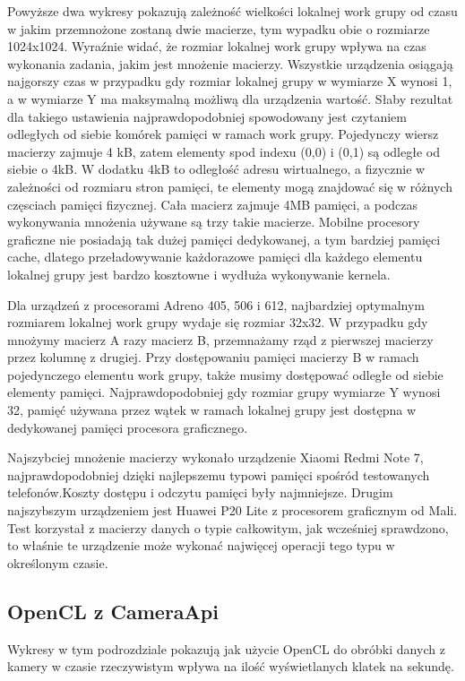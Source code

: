 Powyższe dwa wykresy pokazują zależność wielkości lokalnej work grupy od czasu w jakim przemnożone zostaną dwie macierze, tym wypadku obie o rozmiarze 1024x1024. Wyraźnie widać, że rozmiar lokalnej work grupy wpływa na czas wykonania zadania, jakim jest mnożenie macierzy. Wszystkie urządzenia osiągają najgorszy czas w przypadku gdy rozmiar lokalnej grupy w wymiarze X wynosi 1, a w wymiarze Y ma maksymalną możliwą dla urządzenia wartość. Słaby rezultat dla takiego ustawienia najprawdopodobniej spowodowany jest czytaniem odległych od siebie komórek pamięci w ramach work grupy. Pojedynczy wiersz macierzy zajmuje 4 kB, zatem elementy spod indexu (0,0) i (0,1) są odległe od siebie o 4kB. W dodatku 4kB to odległość adresu wirtualnego, a fizycznie w zależności od rozmiaru stron pamięci, te elementy mogą znajdować się w różnych częsciach pamięci fizycznej. Cała macierz zajmuje 4MB pamięci, a podczas wykonywania mnożenia używane są trzy takie macierze. Mobilne procesory graficzne nie posiadają tak dużej  pamięci dedykowanej, a tym bardziej pamięci cache, dlatego przeładowywanie każdorazowe pamięci dla każdego elementu lokalnej grupy jest bardzo kosztowne i wydłuża wykonywanie kernela. 

Dla urządzeń z procesorami Adreno 405, 506 i 612, najbardziej optymalnym rozmiarem lokalnej work grupy wydaje się rozmiar 32x32. W przypadku gdy mnożymy macierz A razy macierz B, przemnażamy rząd z pierwszej macierzy przez kolumnę z drugiej. Przy dostępowaniu pamięci macierzy B w ramach pojedynczego elementu work grupy, także musimy dostępować odległe od siebie elementy pamięci. Najprawdopodobniej gdy rozmiar grupy  wymiarze Y wynosi 32, pamięć używana przez wątek w ramach lokalnej grupy jest dostępna w dedykowanej pamięci procesora graficznego. 

Najszybciej mnożenie macierzy wykonało urządzenie Xiaomi Redmi Note 7, najprawdopodobniej dzięki najlepszemu typowi pamięci spośród testowanych telefonów.Koszty dostępu i odczytu pamięci były najmniejsze. Drugim najszybszym urządzeniem jest Huawei P20 Lite z procesorem graficznym od Mali. Test korzystał z macierzy danych o typie całkowitym, jak wcześniej sprawdzono, to właśnie te urządzenie może wykonać najwięcej operacji tego typu w określonym czasie.
\subsection[OpenCL z cameraApi]{OpenCL z CameraApi}
Wykresy w tym podrozdziale pokazują jak użycie OpenCL do obróbki danych z kamery w czasie rzeczywistym wpływa na ilość wyświetlanych klatek na sekundę.

